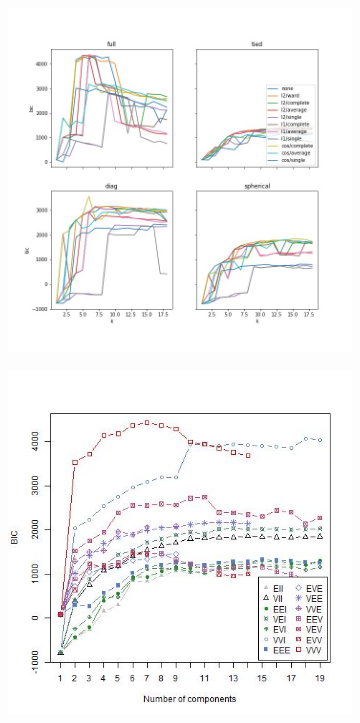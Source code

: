 \documentclass{article}
\begin{document}
\begin{figure}[h!]
\centering
\begin{subfigure}[b]{0.3\linewidth}
  \includegraphics[width=\linewidth]{python_drosophila_bicplot.jpg}
\end{subfigure}
\begin{subfigure}[b]{0.3\linewidth}
  \includegraphics[width=\linewidth]{r_drosophila_bicplot.jpg}
\end{subfigure} 


\end{figure}
\end{document}
